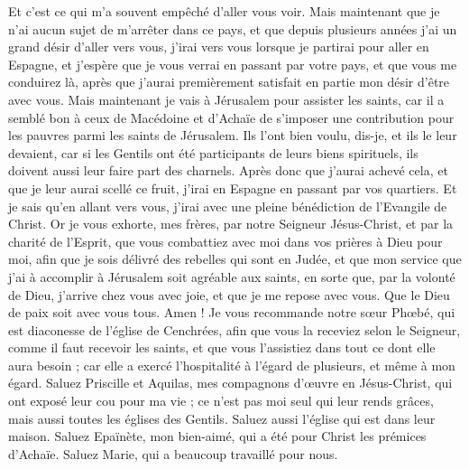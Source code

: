 \begin{multicols}{2}
Et c'est ce qui m'a souvent empêché d'aller vous voir.
Mais maintenant que je n'ai aucun sujet de m'arrêter dans ce pays, et que depuis plusieurs années j'ai un grand désir d'aller vers vous,
j'irai vers vous lorsque je partirai pour aller en Espagne, et j'espère que je vous verrai en passant par votre pays, et que vous me conduirez là, après que j'aurai premièrement satisfait en partie mon désir d'être avec vous.
Mais maintenant je vais à Jérusalem pour assister les saints,
car il a semblé bon à ceux de Macédoine et d'Achaïe de s'imposer une contribution pour les pauvres parmi les saints de Jérusalem.
Ils l'ont bien voulu, dis-je, et ils le leur devaient, car si les Gentils ont été participants de leurs biens spirituels, ils doivent aussi leur faire part des charnels.
Après donc que j'aurai achevé cela, et que je leur aurai scellé ce fruit, j'irai en Espagne en passant par vos quartiers.
Et je sais qu'en allant vers vous, j'irai avec une pleine bénédiction de l'Evangile de Christ.
Or je vous exhorte, mes frères, par notre Seigneur Jésus-Christ, et par la charité de l'Esprit, que vous combattiez avec moi dans vos prières à Dieu pour moi,
afin que je sois délivré des rebelles qui sont en Judée, et que mon service que j'ai à accomplir à Jérusalem soit agréable aux saints,
en sorte que, par la volonté de Dieu, j'arrive chez vous avec joie, et que je me repose avec vous.
Que le Dieu de paix soit avec vous tous. Amen !
\VerseOne{}Je vous recommande notre sœur Phœbé, qui est diaconesse de l'église de Cenchrées,
afin que vous la receviez selon le Seigneur, comme il faut recevoir les saints, et que vous l'assistiez dans tout ce dont elle aura besoin ; car elle a exercé l'hospitalité à l'égard de plusieurs, et même à mon égard.
Saluez Priscille et Aquilas, mes compagnons d'œuvre en Jésus-Christ,
qui ont exposé leur cou pour ma vie ; ce n'est pas moi seul qui leur rends grâces, mais aussi toutes les églises des Gentils.
Saluez aussi l'église qui est dans leur maison. Saluez Epaïnète, mon bien-aimé, qui a été pour Christ les prémices d'Achaïe.
Saluez Marie, qui a beaucoup travaillé pour nous.

\end{multicols}
